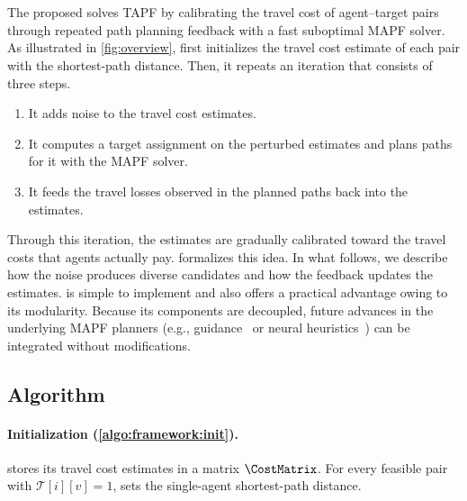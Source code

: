 \section{\planner}
\label{sec:algorithm}


The proposed \planner solves TAPF by calibrating the travel cost of agent--target pairs through repeated path planning feedback with a fast suboptimal MAPF solver.
As illustrated in \cref{fig:overview}, \planner first initializes the travel cost estimate of each pair with the shortest-path distance.
Then, it repeats an iteration that consists of three steps.
\begin{enumerate}
    \item It adds noise to the travel cost estimates.
    \item It computes a target assignment on the perturbed estimates and plans paths for it with the MAPF solver.
    \item It feeds the travel losses observed in the planned paths back into the estimates.
\end{enumerate}
Through this iteration, the estimates are gradually calibrated toward the travel costs that agents actually pay.
 formalizes this idea.
In what follows, we describe how the noise produces diverse candidates and how the feedback updates the estimates.
\planner is simple to implement and also offers a practical advantage owing to its modularity.
Because its components are decoupled, future advances in the underlying MAPF planners (e.g., guidance~\cite{zhang2024guidance,arita2026local} or neural heuristics~\cite{jain2026graph}) can be integrated without modifications.

\subsection{Algorithm}
\paragraph{Initialization (\cref{algo:framework:init}).}
\planner stores its travel cost estimates in a matrix $\CostMatrix$.
For every feasible pair with $\mathcal{T}[i][v]=1$,  sets the single-agent shortest-path distance.

